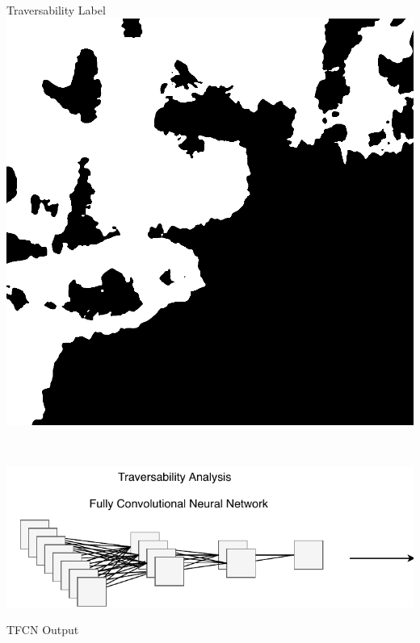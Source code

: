 \documentclass[usenames,dvipsnames,10pt]{beamer}
\begin{document}
\begin{frame}
\begin{minipage}[]{0.3\textwidth}
\end{minipage}
\hspace{0.25cm}
\begin{minipage}[]{0.3\textwidth}
	\centering
	Traversability Label
	\includegraphics[width=\textwidth]{graphics/aerial06-trav.jpg}
\end{minipage} \\
\vspace{0.25cm}
\begin{minipage}[]{0.666\textwidth}
	\includegraphics[width=\textwidth]{graphics/tfcn2.pdf}
\end{minipage}
\begin{minipage}[]{0.3\textwidth}
	\centering
	TFCN Output

\end{minipage}
\end{frame}
\end{document}
